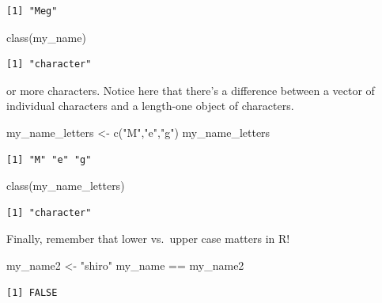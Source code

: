 \documentclass[
  letterpaper,
]{book}
\newenvironment{Shaded}{\begin{snugshade}}{\end{snugshade}}
\newcommand{\FunctionTok}[1]{\textcolor[rgb]{0.28,0.35,0.67}{#1}}
\newcommand{\NormalTok}[1]{\textcolor[rgb]{0.00,0.23,0.31}{#1}}
\newcommand{\OtherTok}[1]{\textcolor[rgb]{0.00,0.23,0.31}{#1}}
\newcommand{\SpecialCharTok}[1]{\textcolor[rgb]{0.37,0.37,0.37}{#1}}
\newcommand{\StringTok}[1]{\textcolor[rgb]{0.13,0.47,0.30}{#1}}
\theoremstyle{definition}
\theoremstyle{definition}
\theoremstyle{plain}
\theoremstyle{definition}
\theoremstyle{plain}
\theoremstyle{plain}
\theoremstyle{remark}
\begin{document}
\begin{verbatim}
[1] "Meg"
\end{verbatim}

\begin{Shaded}
\begin{Highlighting}[]
\FunctionTok{class}\NormalTok{(my\_name)}
\end{Highlighting}
\end{Shaded}

\begin{verbatim}
[1] "character"
\end{verbatim}

or more characters. Notice here that there's a difference between a
vector of individual characters and a length-one object of characters.

\begin{Shaded}
\begin{Highlighting}[]
\NormalTok{my\_name\_letters }\OtherTok{\textless{}{-}}  \FunctionTok{c}\NormalTok{(}\StringTok{"M"}\NormalTok{,}\StringTok{"e"}\NormalTok{,}\StringTok{"g"}\NormalTok{)}
\NormalTok{my\_name\_letters}
\end{Highlighting}
\end{Shaded}

\begin{verbatim}
[1] "M" "e" "g"
\end{verbatim}

\begin{Shaded}
\begin{Highlighting}[]
\FunctionTok{class}\NormalTok{(my\_name\_letters)}
\end{Highlighting}
\end{Shaded}

\begin{verbatim}
[1] "character"
\end{verbatim}

Finally, remember that lower vs.~upper case matters in R!

\begin{Shaded}
\begin{Highlighting}[]
\NormalTok{my\_name2 }\OtherTok{\textless{}{-}} \StringTok{"shiro"}
\NormalTok{my\_name }\SpecialCharTok{==}\NormalTok{ my\_name2}
\end{Highlighting}
\end{Shaded}

\begin{verbatim}
[1] FALSE
\end{verbatim}
\end{document}
